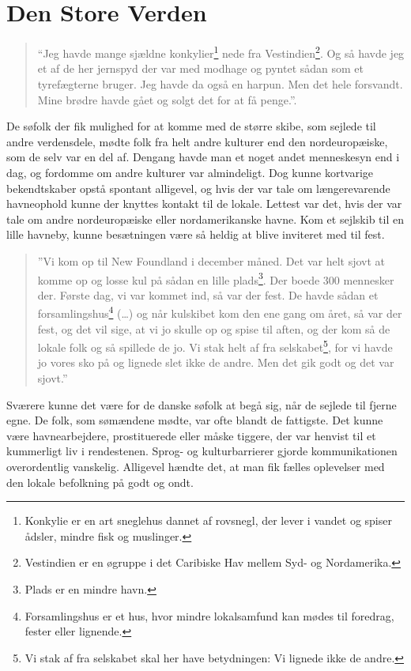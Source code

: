\chapter{Den Store Verden}\label{den-store-verden}

\begin{quote}
``Jeg havde mange sjældne konkylier\footnote{Konkylie er en art
  sneglehus dannet af rovsnegl, der lever i vandet og spiser ådsler,
  mindre fisk og muslinger.} nede fra Vestindien\footnote{Vestindien er
  en øgruppe i det Caribiske Hav mellem Syd- og Nordamerika.}. Og så
havde jeg et af de her jernspyd der var med modhage og pyntet sådan som
et tyrefægterne bruger. Jeg havde da også en harpun. Men det hele
forsvandt. Mine brødre havde gået og solgt det for at få penge.''.
\end{quote}

De søfolk der fik mulighed for at komme med de større skibe, som sejlede
til andre verdensdele, mødte folk fra helt andre kulturer end den
nordeuropæiske, som de selv var en del af. Dengang havde man et noget
andet menneskesyn end i dag, og fordomme om andre kulturer var
almindeligt. Dog kunne kortvarige bekendtskaber opstå spontant
alligevel, og hvis der var tale om længerevarende havneophold kunne der
knyttes kontakt til de lokale. Lettest var det, hvis der var tale om
andre nordeuropæiske eller nordamerikanske havne. Kom et sejlskib til en
lille havneby, kunne besætningen være så heldig at blive inviteret med
til fest.

\begin{quote}
''Vi kom op til New Foundland i december måned. Det var helt sjovt at
komme op og losse kul på sådan en lille plads\footnote{Plads er en
  mindre havn.}. Der boede 300 mennesker der. Første dag, vi var kommet
ind, så var der fest. De havde sådan et forsamlingshus\footnote{Forsamlingshus
  er et hus, hvor mindre lokalsamfund kan mødes til foredrag, fester
  eller lignende.} (\ldots) og når kulskibet kom den ene gang om året,
så var der fest, og det vil sige, at vi jo skulle op og spise til aften,
og der kom så de lokale folk og så spillede de jo. Vi stak helt af fra
selskabet\footnote{Vi stak af fra selskabet skal her have betydningen:
  Vi lignede ikke de andre.}, for vi havde jo vores sko på og lignede
slet ikke de andre. Men det gik godt og det var sjovt.''
\end{quote}

Sværere kunne det være for de danske søfolk at begå sig, når de sejlede
til fjerne egne. De folk, som sømændene mødte, var ofte blandt de
fattigste. Det kunne være havnearbejdere, prostituerede eller måske
tiggere, der var henvist til et kummerligt liv i rendestenen. Sprog- og
kulturbarrierer gjorde kommunikationen overordentlig vanskelig.
Alligevel hændte det, at man fik fælles oplevelser med den lokale
befolkning på godt og ondt.

